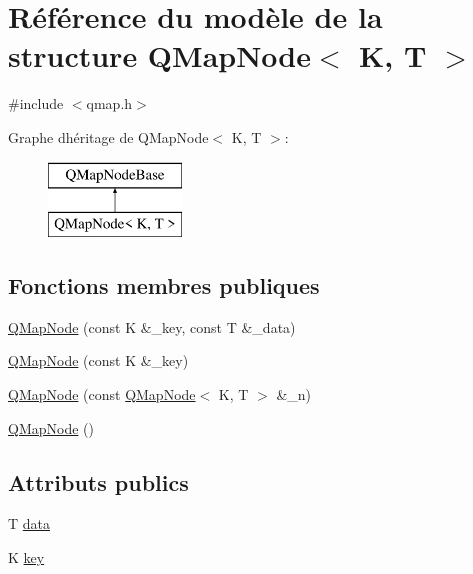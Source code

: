 \hypertarget{struct_q_map_node}{}\section{Référence du modèle de la structure Q\+Map\+Node$<$ K, T $>$}
\label{struct_q_map_node}


{\ttfamily \#include $<$qmap.\+h$>$}

Graphe d\textquotesingle{}héritage de Q\+Map\+Node$<$ K, T $>$\+:\begin{figure}[H]
\begin{center}
\leavevmode
\includegraphics[height=2.000000cm]{struct_q_map_node}
\end{center}
\end{figure}
\subsection*{Fonctions membres publiques}
\begin{DoxyCompactItemize}
\item 
\hyperlink{struct_q_map_node_a07e2c7e12054e93fe05c426815890ac0}{Q\+Map\+Node} (const K \&\+\_\+key, const T \&\+\_\+data)
\item 
\hyperlink{struct_q_map_node_a83c2ba24e5f81421eda88a5001ca95c3}{Q\+Map\+Node} (const K \&\+\_\+key)
\item 
\hyperlink{struct_q_map_node_a55ed928e9d27d83f736044f741fec2e6}{Q\+Map\+Node} (const \hyperlink{struct_q_map_node}{Q\+Map\+Node}$<$ K, T $>$ \&\+\_\+n)
\item 
\hyperlink{struct_q_map_node_abc6f43b6483d3b0406bf3742b3aef241}{Q\+Map\+Node} ()
\end{DoxyCompactItemize}
\subsection*{Attributs publics}
\begin{DoxyCompactItemize}
\item 
T \hyperlink{struct_q_map_node_a91bef0c077e82dc30a9417b85bfb9d42}{data}
\item 
K \hyperlink{struct_q_map_node_a907c0d39418e454f85669ea8dbbb41e6}{key}
\end{DoxyCompactItemize}
